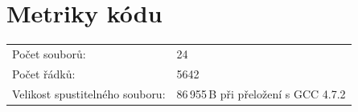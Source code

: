 \documentclass[12pt,a4paper,titlepage,final]{article}
\begin{document}
\section{Metriky kódu} \label{metriky}
\begin{tabular}{ll}
  Počet souborů: & 24 \\
  Počet řádků: & 5642 \\
  Velikost spustitelného souboru: & 86\,955\,B při přeložení s GCC 4.7.2\\
\end{tabular}

%
%
%
\appendix

\end{document}

